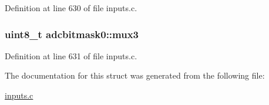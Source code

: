 Definition at line 630 of file inputs.\-c.

\hypertarget{structadcbitmask0_a843117489b46c20f0125704863f92091}{
\subsubsection[{mux3}]{\setlength{\rightskip}{0pt plus 5cm}uint8\-\_\-t adcbitmask0\-::mux3}}\label{structadcbitmask0_a843117489b46c20f0125704863f92091}


Definition at line 631 of file inputs.\-c.



The documentation for this struct was generated from the following file\-:\begin{DoxyCompactItemize}
\item 
\hyperlink{inputs_8c}{inputs.\-c}\end{DoxyCompactItemize}
